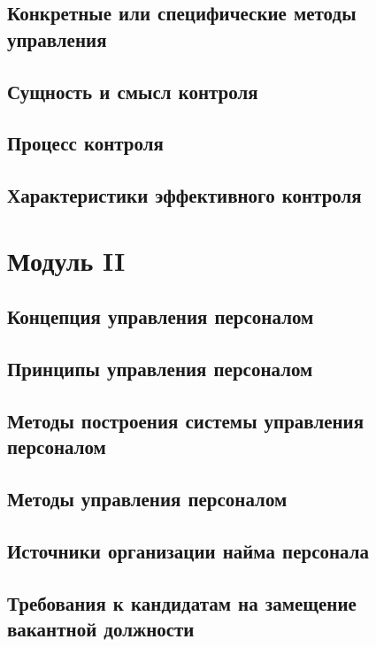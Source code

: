 \documentclass[a4paper,12pt,oneside,final]{extarticle}
\numberwithin{equation}{section}
\begin{document}
\subsection{Конкретные или специфические методы управления}

\subsection{Сущность и смысл контроля}

\subsection{Процесс контроля}

\subsection{Характеристики эффективного контроля}

%
%
\section{Модуль II}
\subsection{Концепция управления персоналом}

\subsection{Принципы управления персоналом}

\subsection{Методы построения системы управления персоналом}

\subsection{Методы управления персоналом}

\subsection{Источники организации найма персонала}

\subsection{Требования к кандидатам на замещение вакантной должности}
\end{document}
